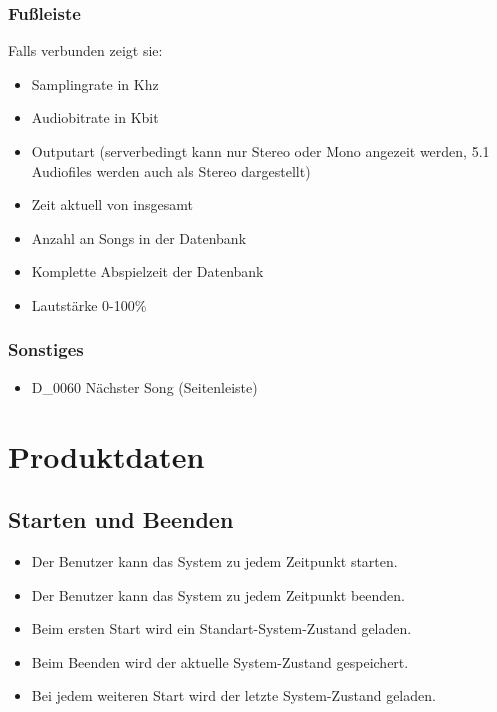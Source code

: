 \subsubsection{Fußleiste}
Falls verbunden zeigt sie:
\begin{itemize}
	\item Samplingrate in Khz
	\item Audiobitrate in Kbit
	\item Outputart (serverbedingt kann nur Stereo oder Mono angezeit werden, 5.1 Audiofiles werden auch als Stereo dargestellt)
	\item Zeit aktuell von insgesamt
	\item Anzahl an Songs in der Datenbank
	\item Komplette Abspielzeit der Datenbank
	\item Lautstärke 0-100\%
\end{itemize}
\subsubsection{Sonstiges}
\begin{itemize}
	\item D\_0060 Nächster Song (Seitenleiste)
\end{itemize}

\section{Produktdaten}

\subsection{Starten und Beenden}
\begin{itemize}
	\item Der Benutzer kann das System zu jedem Zeitpunkt starten.
	\item Der Benutzer kann das System zu jedem Zeitpunkt beenden.
	\item Beim ersten Start wird ein Standart-System-Zustand geladen.
	\item Beim Beenden wird der aktuelle System-Zustand gespeichert.
	\item Bei jedem weiteren Start wird der letzte System-Zustand geladen.
\end{itemize}
